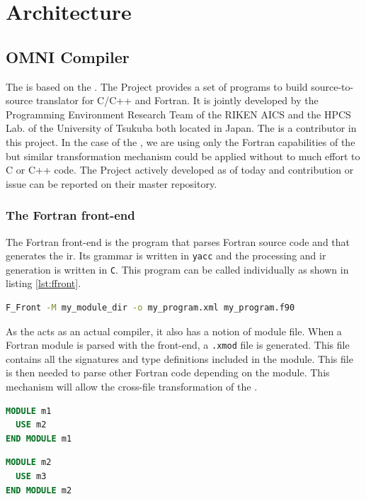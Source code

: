 \chapter{Architecture}
\section{OMNI Compiler}
The \clawfcomp is based on the \omni\cite{omni:website}. The \omni Project
provides a set of programs to build source-to-source translator for C/C++
and Fortran. It is jointly developed by the Programming Environment Research
Team of the RIKEN AICS and the HPCS Lab. of the University of Tsukuba both
located in Japan. The \clawfcomp is a contributor in this project. 
In the case of the \clawfcomp, we are using only the Fortran
capabilities of the \omni but similar transformation mechanism could be
applied without to much effort to C or C++ code. The \omni Project
actively developed as of today and contribution or issue can be reported on 
their master repository\cite{omni:github}.

\subsection{The Fortran front-end}
The Fortran front-end is the program that parses Fortran source code and that
generates the \gls{ir}. Its grammar is written in \lstinline|yacc| and the
processing and \gls{ir} generation is written in \lstinline|C|. This program
can be called individually as shown in listing \ref{lst:ffront}.

\begin{lstlisting}[label=lst:ffront, language=Bash, caption=Call F\_Front]
F_Front -M my_module_dir -o my_program.xml my_program.f90
\end{lstlisting}

As the \omni acts as an actual compiler, it also has a notion of module file. 
When a Fortran module is parsed with the front-end, a \lstinline|.xmod| file is
generated. This file contains all the signatures and type definitions included 
in the module. This file is then needed to parse other Fortran code depending 
on the module. This mechanism will allow the cross-file transformation of the
\clawfcomp.

\begin{lstlisting}[label=lst:m1, language=Fortran, caption=module\_m1.f90]
MODULE m1
  USE m2
END MODULE m1
\end{lstlisting}

\begin{lstlisting}[label=lst:m2, language=Fortran, caption=module\_m2.f90]
MODULE m2
  USE m3
END MODULE m2
\end{lstlisting}

